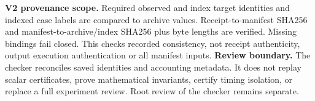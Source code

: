 \documentclass[11pt]{article}
\begin{document}
\textbf{V2 provenance scope.} Required observed and index target identities and indexed case labels are compared to archive values. Receipt-to-manifest SHA256 and manifest-to-archive/index SHA256 plus byte lengths are verified. Missing bindings fail closed. This checks recorded consistency, not receipt authenticity, output execution authentication or all manifest inputs.
\textbf{Review boundary.} The checker reconciles saved identities and accounting metadata. It does not replay scalar certificates, prove mathematical invariants, certify timing isolation, or replace a full experiment review. Root review of the checker remains separate.
\end{document}
